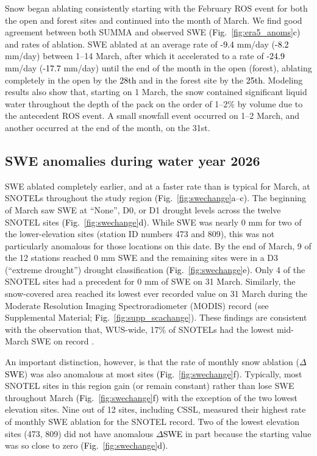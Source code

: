 \documentclass[draft]{agujournal2019}
\newcommand{\fig}[2]{\textcolor{black}{(Fig.~\ref{#1}{#2})}}   %
\newcommand{\fignop}[2]{\textcolor{black}{Fig.~\ref{#1}{#2}}}  %
\newcommand{\mynum}[1]{\textcolor{black}{#1}}
\newcommand{\dswe}{\textcolor{black}{$\Delta$SWE}\xspace}
\begin{document}
Snow began ablating consistently starting with the February ROS event for both the open and forest sites and continued into the month of March.
We find good agreement between both SUMMA and observed SWE \fig{fig:era5_anoms}{c} and rates of ablation.
SWE ablated at an average rate of \mynum{-9.4} mm/day (\mynum{-8.2} mm/day) between 1--14 March, after which it accelerated to a rate of \mynum{-24.9} mm/day (\mynum{-17.7} mm/day) until the end of the month in the open (forest), ablating completely in the open by the \mynum{28th} and in the forest site by the \mynum{25th}.
Modeling results also show that, starting on 1 March, the snow contained significant liquid water throughout the depth of the pack on the order of 1--2\% by volume due to the antecedent ROS event.
A small snowfall event occurred on 1--2 March, and another occurred at the end of the month, on the 31st.


\subsection{SWE anomalies during water year 2026}\label{sec:swe_anomalies}

SWE ablated completely earlier, and at a faster rate than is typical for March, at SNOTELs throughout the study region \fig{fig:swechange}{a--c}.
The beginning of March saw SWE at ``None'', D0, or D1 drought levels across the twelve SNOTEL sites \fig{fig:swechange}{d}.
While SWE was nearly 0 mm for two of the lower-elevation sites (station ID numbers 473 and 809), this was not particularly anomalous for those locations on this date.
By the end of March, 9 of the 12 stations reached 0 mm SWE and the remaining sites were in a D3 (``extreme drought'') drought classification \fig{fig:swechange}{e}.
Only 4 of the SNOTEL sites had a precedent for 0 mm of SWE on 31 March.
Similarly, the snow-covered area reached its lowest ever recorded value on 31 March during the Moderate Resolution Imaging Spectroradiometer (MODIS) record (see Supplemental Material; \fignop{fig:supp_scachange}{}).
These findings are consistent with the observation that, WUS-wide, 17\% of SNOTELs had the lowest mid-March SWE on record \cite{Marshall2026-sy}.

An important distinction, however, is that the rate of monthly snow ablation (\dswe) was also anomalous at most sites \fig{fig:swechange}{f}.
Typically, most SNOTEL sites in this region gain (or remain constant) rather than lose SWE throughout March \fig{fig:swechange}{f} with the exception of the two lowest elevation sites.
Nine out of 12 sites, including CSSL, measured their highest rate of monthly SWE ablation for the SNOTEL record.
Two of the lowest elevation sites (473, 809) did not have anomalous \dswe in part because the starting value was so close to zero \fig{fig:swechange}{d}.
\end{document}
